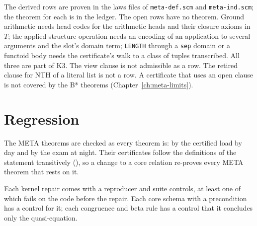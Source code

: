 The derived rows are proven in the laws files of
\texttt{meta-def.scm} and \texttt{meta-ind.scm}; the theorem for each is
in the ledger.  The open rows have no theorem.  Ground arithmetic needs
head codes for the arithmetic heads and their closure axioms in $T$; the
applied structure operation needs an encoding of an application to
several arguments and the slot's domain term; \texttt{LENGTH} through a
\texttt{sep} domain or a functoid body needs the certificate's walk to a
class of tuples transcribed.  All three are part of K3.  The view clause
is not admissible as a row.  The retired clause for $\mathrm{NTH}$ of a
literal list is not a row.  A certificate that uses an open clause is not
covered by the B* theorems (Chapter~\ref{ch:meta-limits}).

\section{Regression}\label{sec:meta-regression}

The META theorems are checked as every theorem is: by the certified load
by day and by the exam at night.  Their certificates follow the
definitions of the statement transitively (), so a change to a
core relation re-proves every META theorem that rests on it.

Each kernel repair comes with a reproducer and suite controls, at least
one of which fails on the code before the repair.  Each core schema with
a precondition has a control for it; each congruence and beta rule has a
control that it concludes only the quasi-equation.

